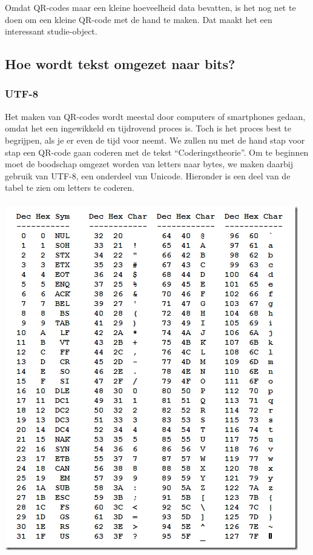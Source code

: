 \documentclass{article}
\begin{document}
Omdat QR-codes maar een kleine hoeveelheid data bevatten, is het nog net te doen om een kleine QR-code met de hand te maken. Dat maakt het een interessant studie-object.

\subsection{Hoe wordt tekst omgezet naar bits?}
\subsubsection{UTF-8}
Het maken van QR-codes wordt meestal door computers of smartphones gedaan, omdat het een ingewikkeld en tijdrovend proces is. Toch is het proces best te begrijpen, als je er even de tijd voor neemt. We zullen nu met de hand stap voor stap een QR-code gaan coderen met de tekst “Coderingstheorie”.
Om te beginnen moet de boodschap omgezet worden van letters naar bytes, we maken daarbij gebruik van UTF-8, een onderdeel van Unicode. Hieronder is een deel van de tabel te zien om letters te coderen.\\\\
\includegraphics[width=0.4\linewidth]{unicode.png}
\end{document}
